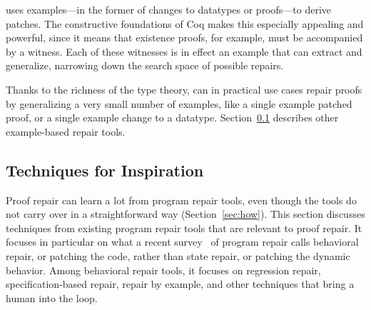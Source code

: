 \sysnamelong uses examples---in the former of changes to datatypes or proofs---to derive patches.
The constructive foundations of Coq makes this especially appealing and powerful,
since it means that existence proofs, for example, must be accompanied by a witness.
Each of these witnesses is in effect an example that \sysnamelong can extract and generalize,
narrowing down the search space of possible repairs.

Thanks to the richness of the type theory, \sysnamelong can in practical use cases repair proofs by generalizing a very small number of examples,
like a single example patched proof, or a single example change to a datatype.
Section~\ref{sec:techniques} describes other example-based repair tools.

\subsection{Techniques for Inspiration}
\label{sec:techniques}


Proof repair can learn a lot from program repair tools, even though the tools do not carry over in a straightforward way (Section~\ref{sec:how}).
This section discusses techniques from existing program repair tools that are relevant to proof repair.
It focuses in particular on what a recent survey~\cite{Monperrus:2018:ASR:3177787.3105906} of program repair calls behavioral repair,
or patching the code, rather than state repair, or patching the dynamic behavior.
Among behavioral repair tools, it focuses on regression repair, specification-based repair,
repair by example, and other techniques that bring a human into the loop.

